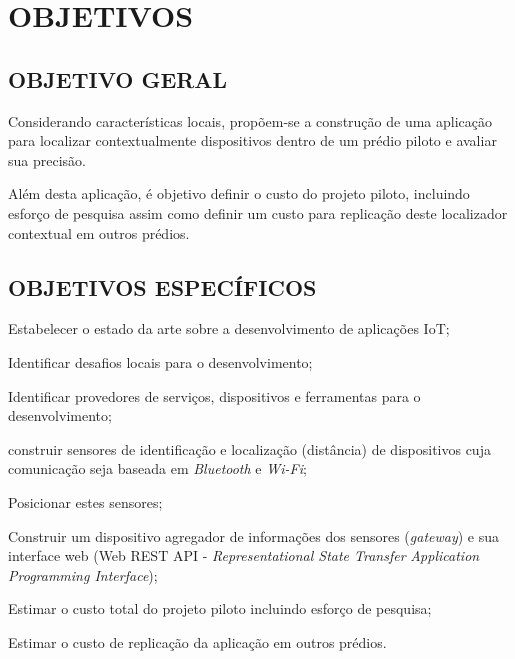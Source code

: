 
\chapter{OBJETIVOS}
\label{chap:OBJETIVOS}

\section{OBJETIVO GERAL}
\label{sec:OBJETIVO GERAL}

Considerando características locais, propõem-se a construção de uma aplicação
para localizar contextualmente dispositivos dentro de um prédio piloto e avaliar
sua precisão.

Além desta aplicação, é objetivo definir o custo do projeto piloto, incluindo
esforço de pesquisa assim como definir um custo para replicação deste
localizador contextual em outros prédios.

\section{OBJETIVOS ESPECÍFICOS}
\label{sec:OBJETIVOS ESPECÍFICOS}

\begin{alineas}

	\item Estabelecer o estado da arte sobre a desenvolvimento de aplicações IoT;

	\item Identificar desafios locais para o desenvolvimento;

	\item Identificar provedores de serviços, dispositivos e ferramentas para o
desenvolvimento;

	\item construir sensores de identificação e localização (distância) de
 dispositivos cuja comunicação seja baseada em \textit{Bluetooth} e 	\textit{Wi-Fi};

	\item Posicionar estes sensores;

	\item Construir um dispositivo agregador de informações dos sensores
 (\textit{gateway}) e sua interface web (Web REST API - \textit{Representational
State Transfer} \textit{Application Programming Interface});

	\item Estimar o custo total do projeto piloto incluindo esforço de pesquisa;

	\item Estimar o custo de replicação da aplicação em outros prédios.

\end{alineas}